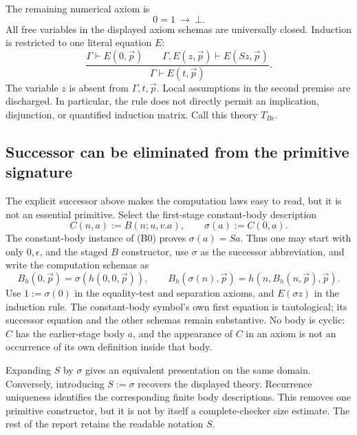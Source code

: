 The remaining numerical axiom is
\[
 0=1\ \longrightarrow\ \bot.\tag{Separation}\label{basis:sep}
\]
All free variables in the displayed axiom schemas are universally closed. Induction is restricted to one literal equation $E$:
\[
 \frac{\Gamma\vdash E(0,\vec p)\qquad
       \Gamma,E(z,\vec p)\vdash E(Sz,\vec p)}
      {\Gamma\vdash E(t,\vec p)}.
 \tag{EI}\label{basis:ei}
\]
The variable $z$ is absent from $\Gamma,t,\vec p$. Local assumptions in the second premise are discharged. In particular, the rule does not directly permit an implication, disjunction, or quantified induction matrix. Call this theory $T_{B\epsilon}$.

\subsection{Successor can be eliminated from the primitive signature}
The explicit successor above makes the computation laws easy to read, but it is not an essential primitive. Select the first-stage constant-body description
\[
 C(n,a):=B(n;u,v.a),\qquad \sigma(a):=C(0,a).
\]
The constant-body instance of (B0) proves $\sigma(a)=Sa$. Thus one may start with only $0,\epsilon$, and the staged $B$ constructor, use $\sigma$ as the successor abbreviation, and write the computation schemas as
\[
 B_h(0,\vec p)=\sigma(h(0,0,\vec p)),\qquad
 B_h(\sigma(n),\vec p)=h(n,B_h(n,\vec p),\vec p).
\]
Use $1:=\sigma(0)$ in the equality-test and separation axioms, and $E(\sigma z)$ in the induction rule. The constant-body symbol's own first equation is tautological; its successor equation and the other schemas remain substantive. No body is cyclic: $C$ has the earlier-stage body $a$, and the appearance of $C$ in an axiom is not an occurrence of its own definition inside that body.

Expanding $S$ by $\sigma$ gives an equivalent presentation on the same domain. Conversely, introducing $S:=\sigma$ recovers the displayed theory. Recurrence uniqueness identifies the corresponding finite body descriptions. This removes one primitive constructor, but it is not by itself a complete-checker size estimate. The rest of the report retains the readable notation $S$.

